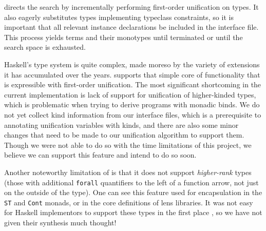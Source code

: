 \Rulecheck directs the search by incrementally performing first-order unification on types. It also eagerly substitutes types implementing typeclass constraints, so it is important that all relevant instance declarations be included in the interface file. This process yields terms and their monotypes until terminated or until the search space is exhausted.

Haskell's type system is quite complex, made moreso by the variety of extensions it has accumulated over the years. \Rulecheck supports that simple core of functionality that is expressible with first-order unification. The most significant shortcoming in the current implementation is lack of support for unification of higher-kinded types, which is problematic when trying to derive programs with monadic binds. We do not yet collect kind information from our interface files, which is a prerequisite to annotating unification variables with kinds, and there are also some minor changes that need to be made to our unification algorithm to support them. Though we were not able to do so with the time limitations of this project, we believe we can support this feature and intend to do so soon.

Another noteworthy limitation of \Rulecheck is that it does not support \textit{higher-rank} types (those with additional \texttt{forall} quantifiers to the left of a function arrow, not just on the outside of the type). One can see this feature used for encapsulation in the \texttt{ST} and \texttt{Cont} monads, or in the core definitions of lens libraries. It was not easy for Haskell implementors to support these types in the first place \cite{jones2007practical}, so we have not given their synthesis much thought!
